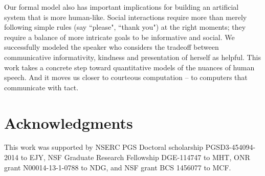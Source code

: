 \documentclass[12pt]{article}
\begin{document}
Our formal model also has important implications for building an artificial system that is more human-like. 
Social interactions require more than merely following simple rules (say ``please", ``thank you") at the right moments; 
they require a balance of more intricate goals to be informative and social. 
We successfully modeled the speaker who considers the tradeoff between 
communicative informativity, kindness and presentation of herself as helpful. 
This work takes a concrete step toward quantitative models of the nuances of human speech. 
And it moves us closer to courteous computation -- to computers that communicate with tact.













\section*{Acknowledgments}
This work was supported by NSERC PGS Doctoral scholarship PGSD3-454094-2014 to EJY, NSF Graduate Research Fellowship DGE-114747 to MHT, ONR grant N00014-13-1-0788 to NDG, and NSF grant BCS 1456077 to MCF.
\end{document}
